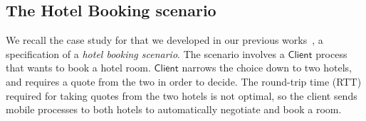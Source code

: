 \documentclass[preprint,11pt]{elsarticle}
\newcommand{\Client}{\mathsf{Client}}
\begin{document}
{{%

\subsection{The Hotel Booking scenario}\label{ss:hotel}
We recall the case study for \HOp that we developed in our previous works~\cite{characteristic_bis,KouzapasPY17}, a specification of a \emph{hotel booking scenario}.
The scenario involves a $\Client$ process that wants to book
a hotel room. %
$\Client$
narrows the choice down to two hotels, and requires 
 a quote from the two in order to
decide. The round-trip time (RTT) required for
taking quotes from the two hotels is not optimal, %
so the client sends mobile processes to both hotels
to automatically negotiate and book a room. 


}}
\end{document}
